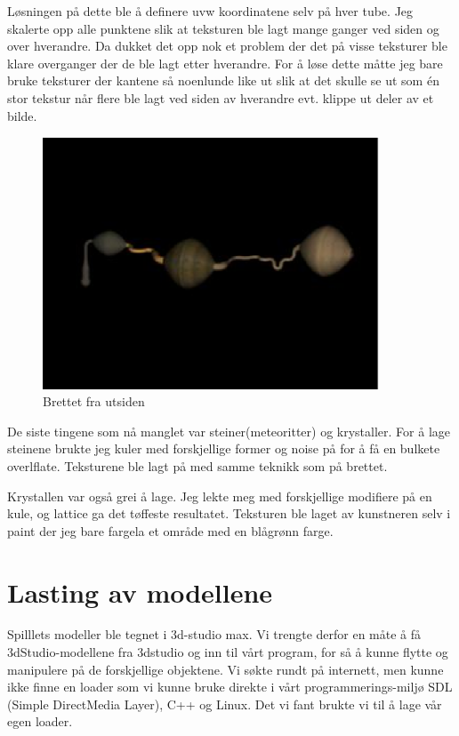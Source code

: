 \documentclass[11pt, dvips]{report}
\begin{document}
Løsningen på dette ble å definere uvw koordinatene selv på hver tube.
Jeg skalerte opp alle punktene slik at teksturen ble lagt mange ganger
ved siden og over hverandre. Da dukket det opp nok et problem der det
på visse teksturer ble klare overganger der de ble lagt etter
hverandre. For å løse dette måtte jeg bare bruke teksturer der kantene
så noenlunde like ut slik at det skulle se ut som én stor tekstur når
flere ble lagt ved siden av hverandre evt. klippe ut deler av et
bilde.

\begin{figure}[!hbtp]
\center\includegraphics[width=10cm]{image005.eps}
\caption{Brettet fra utsiden}
\end{figure}

De siste tingene som nå manglet var steiner(meteoritter) og
krystaller. For å lage steinene brukte jeg kuler med forskjellige
former og noise på for å få en bulkete overlflate. Teksturene ble
lagt på med samme teknikk som på brettet.

Krystallen var også grei å lage. Jeg lekte meg med forskjellige
modifiere på en kule, og lattice ga det tøffeste resultatet. Teksturen
ble laget av kunstneren selv i paint der jeg bare fargela et område
med en blågrønn farge.

\chapter{Lasting av modellene}\label{3dload}

Spilllets modeller ble tegnet i 3d-studio max. Vi trengte derfor en
måte å få 3dStudio-modellene fra 3dstudio og inn til vårt program, for
så å kunne flytte og manipulere på de forskjellige objektene. Vi søkte
rundt på internett, men kunne ikke finne en loader som vi kunne bruke
direkte i vårt programmerings-miljø SDL (Simple DirectMedia Layer),
C++ og Linux. Det vi fant brukte vi til å lage vår egen loader.
\end{document}
